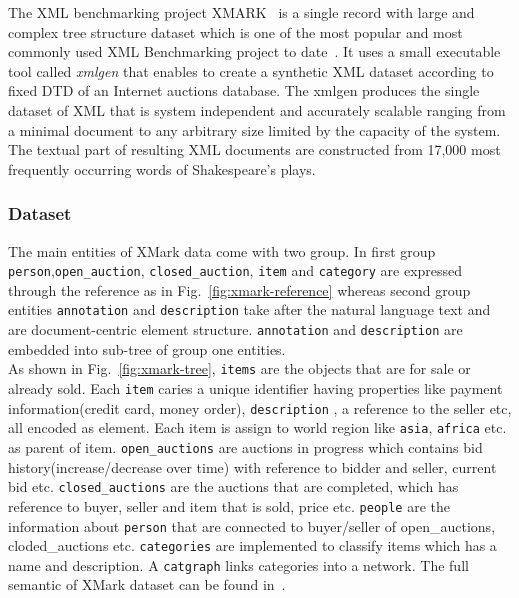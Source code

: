 The XML benchmarking project XMARK~\cite{xmark/original} is a single record with large and complex tree structure dataset which is one of the most popular and most commonly used XML Benchmarking project to date~\cite{xmark/mlynkova2008xml}. It uses a small executable tool called  \textit{xmlgen} that enables to create a synthetic XML dataset according to fixed DTD of an Internet auctions database. The xmlgen produces the single dataset of XML that is system independent and accurately scalable ranging from a minimal document to any arbitrary size limited by the capacity of the system. The textual part of resulting XML documents are constructed from 17,000 most frequently occurring words of Shakespeare's plays.
\label{xmark-dataset}
\subsubsection{Dataset}
The main entities of XMark data come with two group. In first group \texttt{person},\texttt{open\_auction}, \texttt{closed\_auction}, \texttt{item} and \texttt{category} are expressed through the reference as in Fig.~\ref{fig:xmark-reference} whereas second group entities \texttt{annotation} and \texttt{description} take after the natural language text and are document-centric element structure. \texttt{annotation} and \texttt{description} are embedded into sub-tree of group one entities. 
\\
As shown in Fig.~\ref{fig:xmark-tree}, \texttt{items} are the objects that are for sale or already sold. Each \texttt{item} caries a unique identifier having properties like payment information(credit card, money order), \texttt{description} , a reference to the seller etc, all encoded as element. Each item is assign to world region like \texttt{asia}, \texttt{africa} etc. as parent of item. \texttt{open\_auctions} are auctions in progress which contains bid history(increase/decrease over time) with reference to bidder and seller, current bid etc. \texttt{closed\_auctions} are the auctions that are completed, which has reference to buyer, seller and item that is sold, price etc. \texttt{people} are the information about \texttt{person} that are connected to buyer/seller of open\_auctions, cloded\_auctions etc. \texttt{categories} are implemented to classify items which has a name and description. A \texttt{catgraph} links categories into a network.  The full semantic of XMark dataset can be found in~\cite{xmark/original}.

